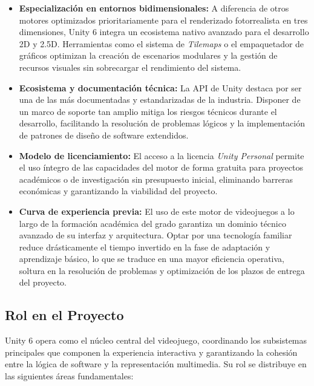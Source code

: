 \begin{itemize}
    \item \textbf{Especialización en entornos bidimensionales:} A diferencia de otros motores optimizados prioritariamente para el renderizado fotorrealista en tres dimensiones, Unity 6 integra un ecosistema nativo avanzado para el desarrollo 2D y 2.5D. Herramientas como el sistema de \textit{Tilemaps} o el empaquetador de gráficos optimizan la creación de escenarios modulares y la gestión de recursos visuales sin sobrecargar el rendimiento del sistema.
    
    \item \textbf{Ecosistema y documentación técnica:} La API de Unity destaca por ser una de las más documentadas y estandarizadas de la industria. Disponer de un marco de soporte tan amplio mitiga los riesgos técnicos durante el desarrollo, facilitando la resolución de problemas lógicos y la implementación de patrones de diseño de software extendidos.
    
    \item \textbf{Modelo de licenciamiento:} El acceso a la licencia \textit{Unity Personal} permite el uso íntegro de las capacidades del motor de forma gratuita para proyectos académicos o de investigación sin presupuesto inicial, eliminando barreras económicas y garantizando la viabilidad del proyecto.

    \item \textbf{Curva de experiencia previa:} El uso de este motor de videojuegos a lo largo de la formación académica del grado garantiza un dominio técnico avanzado de su interfaz y arquitectura. Optar por una tecnología familiar reduce drásticamente el tiempo invertido en la fase de adaptación y aprendizaje básico, lo que se traduce en una mayor eficiencia operativa, soltura en la resolución de problemas y optimización de los plazos de entrega del proyecto.
\end{itemize}

\subsection{Rol en el Proyecto}
Unity 6 opera como el núcleo central del videojuego, coordinando los subsistemas principales que componen la experiencia interactiva y garantizando la cohesión entre la lógica de software y la representación multimedia. Su rol se distribuye en las siguientes áreas fundamentales:

